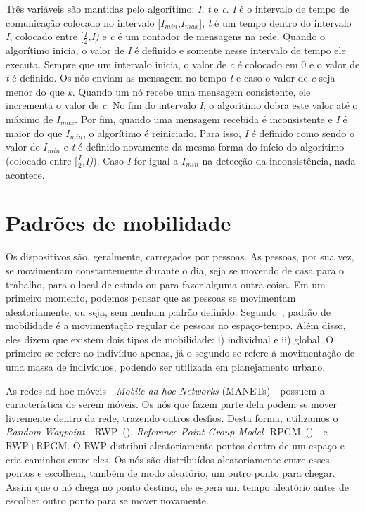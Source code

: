 \documentclass[11pt,a4paper,titlepage]{article}
\begin{document}
Três variáveis são mantidas pelo algorítimo: \textit{I}, \textit{t} e \textit{c}.
\textit{I} é o intervalo de tempo de comunicação colocado no intervalo [$I_{min}$,$I_{max}$], \textit{t} é um tempo dentro do intervalo \textit{I}, colocado entre [\textit{$\frac{I}{2}$,I)} e \textit{c} é um contador de mensagens na rede.
Quando o algorítimo inicia, o valor de \textit{I} é definido e somente nesse intervalo de tempo ele executa.
Sempre que um intervalo inicia, o valor de \textit{c} é colocado em 0 e o valor de \textit{t} é definido.
Os nós enviam as mensagem no tempo \textit{t} e caso o valor de \textit{c} seja menor do que \textit{k}.
Quando um nó recebe uma mensagem consistente, ele incrementa o valor de \textit{c}.
No fim do intervalo \textit{I}, o algorítimo dobra este valor até o máximo de $I_{max}$.
Por fim, quando uma mensagem recebida é inconsistente e \textit{I} é maior do que $I_{min}$, o algorítimo é reiniciado.
Para isso, \textit{I} é definido como sendo o valor de $I_{min}$ e \textit{t} é definido novamente da mesma forma do início do algorítimo (colocado entre [\textit{$\frac{I}{2}$,I)}).
Caso \textit{I} for igual a $I_{min}$ na detecção da inconsistência, nada acontece.


\section{Padrões de mobilidade}
\label{sec:mobPtn}

Os dispositivos são, geralmente, carregados por pessoas.
As pessoas, por sua vez, se movimentam constantemente durante o dia, seja se movendo de casa para o trabalho, para o local de estudo ou para fazer alguma outra coisa.
Em um primeiro momento, podemos pensar que as pessoas se movimentam aleatoriamente, ou seja, sem nenhum padrão definido.
Segundo~\cite{Jie}, padrão de mobilidade é a movimentação regular de pessoas no espaço-tempo.
Além disso, eles dizem que existem dois tipos de mobilidade: i) individual e ii) global.
O primeiro se refere ao indivíduo apenas, já o segundo se refere à movimentação de uma massa de indivíduos, podendo ser utilizada em planejamento urbano.

As redes ad-hoc móveis - \textit{Mobile ad-hoc Networks} (MANETs) - possuem a característica de serem móveis.
Os nós que fazem parte dela podem se mover livremente dentro da rede, trazendo outros desfios.
Desta forma, utilizamos o \textit{Random Waypoint} - RWP~(\cite{RWP}), \textit{Reference Point Group Model} -RPGM~(\cite{RPGM}) - e RWP+RPGM.
O RWP distribui aleatoriamente pontos dentro de um espaço e cria caminhos entre eles.
Os nós são distribuídos aleatoriamente entre esses pontos e escolhem, também de modo aleatório, um outro ponto para chegar.
Assim que o nó chega no ponto destino, ele espera um tempo aleatório antes de escolher outro ponto para se mover novamente.
\end{document}
